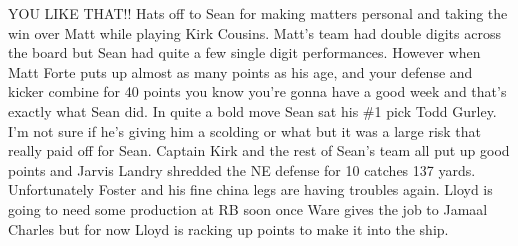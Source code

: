 \documentclass[11pt,letterpaper]{article}
\begin{document}
\bigskip
\par\noindent YOU LIKE THAT!! Hats off to Sean for making matters personal and taking the win over Matt while playing Kirk Cousins. Matt's team had double digits across the board but Sean had quite a few single digit performances. However when Matt Forte puts up almost as many points as his age, and your defense and kicker combine for 40 points you know you're gonna have a good week and that's exactly what Sean did. In quite a bold move Sean sat his \#1 pick Todd Gurley. I'm not sure if he's giving him a scolding or what but it was a large risk that really paid off for Sean. Captain Kirk and the rest of Sean's team all put up good points and Jarvis Landry shredded the NE defense for 10 catches 137 yards. Unfortunately Foster and his fine china legs are having troubles again. Lloyd is going to need some production at RB soon once Ware gives the job to Jamaal Charles but for now Lloyd is racking up points to make it into the ship.
\end{document}
